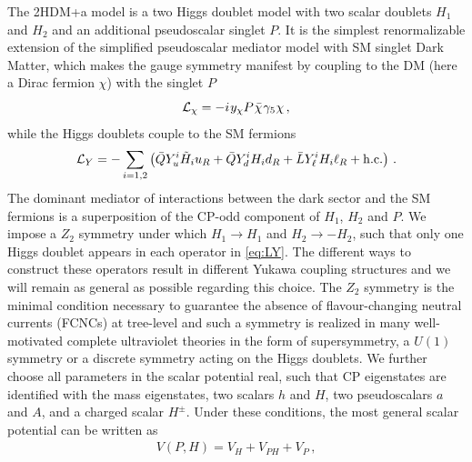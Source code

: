 




The 2HDM+a model is a two Higgs doublet model with two scalar doublets $H_1$ and $H_2$ and an additional pseudoscalar singlet $P$. It is the simplest renormalizable extension of the simplified pseudoscalar mediator model with SM singlet Dark Matter, which makes the gauge symmetry manifest by coupling to the DM (here a Dirac fermion $\chi$) with the singlet $P$
%
\begin{equation} \label{eq:Lx}
{\cal L}_\chi = - i \hspace{0.25mm} y_\chi P \hspace{0.25mm} \bar \chi \hspace{0.25mm} \gamma_5 \hspace{0.1mm} \chi \,,
\end{equation}
while the Higgs doublets couple to the SM fermions 
\begin{equation} \label{eq:LY}
{\cal L}_{Y} = - \sum_{i=1,2} \left ( \bar Q Y_u^i \tilde H_i u_R  + \bar Q Y_d^i H_i d_R   + \bar L Y_\ell^i H_i \ell_R  + {\rm h.c.}  \right ) \,.
\end{equation}
The dominant mediator of interactions between the dark sector and the SM fermions is a superposition of the CP-odd component of $H_1$, $H_2$ and $P$. 
We impose a $Z_2$ symmetry under which $H_1\to H_1$ and $H_2\to -H_2$, such that only one Higgs doublet appears in each operator in \eqref{eq:LY}. The different ways to construct these operators result in different Yukawa coupling structures and we will remain as general as possible regarding this choice. 
The $Z_2$ symmetry is the minimal condition necessary to guarantee the absence of flavour-changing neutral currents (FCNCs) at tree-level \cite{Glashow:1976nt,Paschos:1976ay} and such a symmetry is realized in many well-motivated complete ultraviolet theories in the form of supersymmetry, a $U(1)$ symmetry or  a discrete symmetry acting on the Higgs doublets. We further choose all parameters in the scalar potential real, such that CP eigenstates are identified with the mass eigenstates, two scalars $h$ and $H$, two pseudoscalars $a$ and $A$, and a charged scalar $H^\pm$. Under these conditions, the most general scalar potential can be written as 
\begin{align}
V(P,H)=V_H+V_{PH}+V_P\,,
\end{align}
